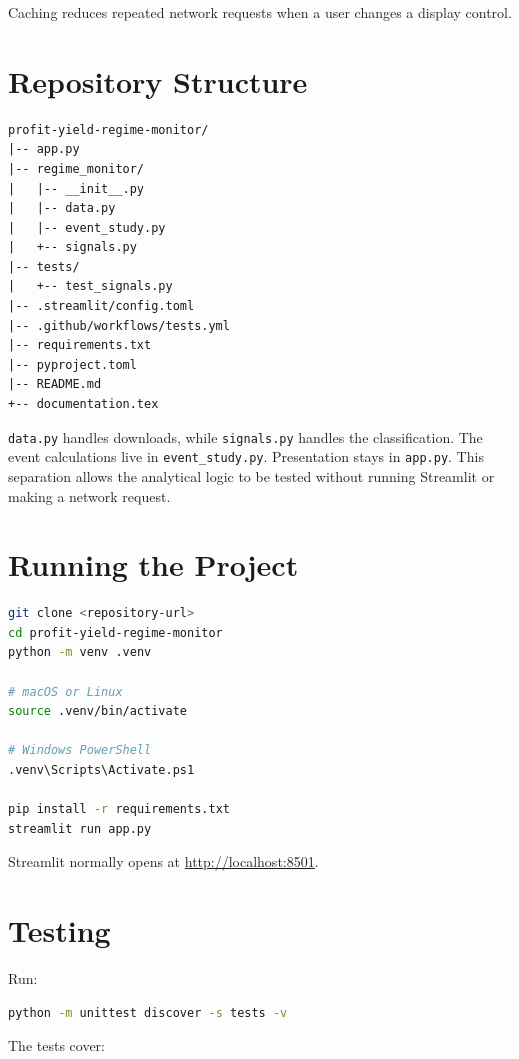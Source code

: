 \documentclass[11pt]{article}
\begin{document}
Caching reduces repeated network requests when a user changes a display
control.

\section{Repository Structure}

\begin{verbatim}
profit-yield-regime-monitor/
|-- app.py
|-- regime_monitor/
|   |-- __init__.py
|   |-- data.py
|   |-- event_study.py
|   +-- signals.py
|-- tests/
|   +-- test_signals.py
|-- .streamlit/config.toml
|-- .github/workflows/tests.yml
|-- requirements.txt
|-- pyproject.toml
|-- README.md
+-- documentation.tex
\end{verbatim}

\texttt{data.py} handles downloads, while \texttt{signals.py} handles the
classification. The event calculations live in
\texttt{event\_study.py}. Presentation stays in \texttt{app.py}. This
separation allows the analytical logic to be tested without running Streamlit
or making a network request.

\section{Running the Project}

\begin{lstlisting}[style=code,language=bash,numbers=none]
git clone <repository-url>
cd profit-yield-regime-monitor
python -m venv .venv

# macOS or Linux
source .venv/bin/activate

# Windows PowerShell
.venv\Scripts\Activate.ps1

pip install -r requirements.txt
streamlit run app.py
\end{lstlisting}

Streamlit normally opens at \url{http://localhost:8501}.

\section{Testing}

Run:

\begin{lstlisting}[style=code,language=bash,numbers=none]
python -m unittest discover -s tests -v
\end{lstlisting}

The tests cover:
\end{document}
